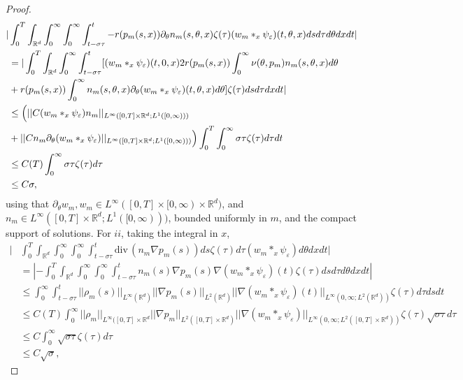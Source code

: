 \documentclass{amsart}
\def\R{\mathbb R}
\def\div{\mathrm{div}\,}
\begin{document}
\begin{proof}
\begin{align*}
    |&\int_{0}^{T}\int_{\R^d}\int_{0}^{\infty}\int_{0}^{\infty}\int_{t-\sigma \tau}^{t}-r(p_m(s,x))\partial_\theta n_m(s,\theta,x)\zeta(\tau)(w_m *_x \psi_\varepsilon)(t,\theta,x)dsd\tau d\theta dx dt| \\
    &=|\int_{0}^{T}\int_{\R^d}\int_{0}^{\infty}\int_{t-\sigma \tau}^{t}[(w_m*_x \psi_\varepsilon)(t,0,x)2r(p_m(s,x))\int_{0}^{\infty}\nu(\theta,p_m)n_m(s,\theta,x)d\theta\\&+r(p_m(s,x))\int_{0}^{\infty}n_m(s,\theta,x)\partial_\theta (w_m *_x \psi_\varepsilon)(t,\theta,x)d\theta] \zeta(\tau) ds d\tau dx dt |\\
    &\leq \Bigl(||C(w_m *_x \psi_\varepsilon) n_m||_{L^\infty([0,T]\times \R^d;L^1([0,\infty)))}\\&+||Cn_m \partial_\theta (w_m *_x \psi_\varepsilon)||_{L^\infty([0,T]\times \R^d; L^1([0,\infty)))}\Bigr)\int_{0}^{T}\int_{0}^{\infty}\sigma \tau \zeta(\tau)d\tau dt \\
    & \leq C(T)\int_{0}^{\infty}\sigma \tau \zeta(\tau) d\tau  \\
    & \leq C\sigma,
\end{align*}
using that $\partial_\theta w_m, w_m
\in L^\infty([0,T]\times[0,\infty)\times\R^d)$, and $n_m \in L^\infty([0,T]\times \R^d;L^1([0,\infty)))$, bounded uniformly in $m$, and the compact support of solutions.
For $ii$, taking the integral in $x$,
\begin{align*}
    |&\int_{0}^{T}\int_{\R^d}\int_{0}^{\infty}\int_{0}^{\infty}\int_{t-\sigma \tau}^{t}\div(n_m\nabla p_m(s))ds \zeta(\tau) d\tau (w_m *_x \psi_\varepsilon)d\theta dx dt |\\
    &= |-\int_{0}^{T}\int_{\R^d}\int_{0}^{\infty}\int_{0}^{\infty}\int_{t-\sigma \tau}^{t}n_m(s) \nabla p_m(s)\nabla (w_m *_x \psi_\varepsilon)(t)\zeta(\tau) ds d\tau d\theta dx dt |\\
    & \leq \int_{0}^{\infty}\int_{t-\sigma \tau}^{t} ||\rho_m(s)||_{L^\infty(\R^d)}||\nabla p_m (s)||_{L^2(\R^d)}||\nabla (w_m *_x \psi_\varepsilon)(t)||_{L^\infty(0,\infty;L^2(\R^d))} \zeta(\tau)d\tau ds dt\\
    & \leq C(T)\int_{0}^{\infty}||\rho_m||_{L^\infty([0,T]\times\R^d}||\nabla p_m||_{L^2([0,T]\times \R^d)}||\nabla (w_m *_x \psi_\varepsilon )||_{L^\infty(0,\infty;L^2([0,T]\times \R^d))}\zeta(\tau)\sqrt{\sigma \tau} d\tau \\
    & \leq C\int_{0}^{\infty}\sqrt{\sigma \tau} \zeta(\tau)d\tau \\
    & \leq C\sqrt{\sigma},

\end{align*}
\end{proof}
\end{document}

